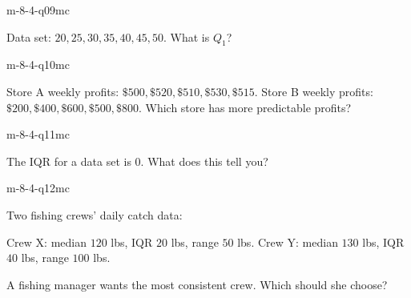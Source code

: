 \begin{practiceQuestion}{m-8-4-q09}{mc}
\begin{questionText}
Data set: $20, 25, 30, 35, 40, 45, 50$. What is $Q_1$?
\end{questionText}
\end{practiceQuestion}

\begin{practiceQuestion}{m-8-4-q10}{mc}
\begin{questionText}
Store A weekly profits: $\$500, \$520, \$510, \$530, \$515$.
Store B weekly profits: $\$200, \$400, \$600, \$500, \$800$.
Which store has more predictable profits?
\end{questionText}
\end{practiceQuestion}

\begin{practiceQuestion}{m-8-4-q11}{mc}
\begin{questionText}
The IQR for a data set is $0$. What does this tell you?
\end{questionText}
\end{practiceQuestion}

\begin{practiceQuestion}{m-8-4-q12}{mc}
\begin{questionText}
Two fishing crews' daily catch data:

Crew X: median $120$ lbs, IQR $20$ lbs, range $50$ lbs.
Crew Y: median $130$ lbs, IQR $40$ lbs, range $100$ lbs.

A fishing manager wants the most consistent crew. Which should she choose?
\end{questionText}
\end{practiceQuestion}


